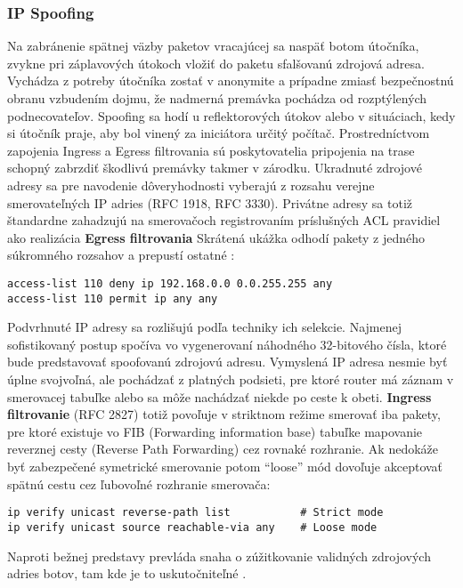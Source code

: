 \documentclass[12pt, a4paper]{article}
\begin{document}
\subsubsection{IP Spoofing}
Na zabránenie spätnej väzby paketov vracajúcej sa naspäť botom útočníka, zvykne pri záplavových útokoch 
vložiť do paketu sfalšovanú zdrojová adresa. Vychádza z potreby útočníka zostať v anonymite a prípadne 
zmiasť bezpečnostnú obranu vzbudením dojmu, že nadmerná premávka pochádza od rozptýlených podnecovateľov. 
Spoofing sa hodí u reflektorových útokov alebo v situáciach, kedy si útočník praje, aby bol vinený za 
iniciátora určitý počítač. Prostredníctvom zapojenia Ingress a Egress filtrovania sú poskytovatelia 
pripojenia na trase schopný zabrzdiť škodlivú premávky takmer v zárodku. Ukradnuté zdrojové adresy sa 
pre navodenie dôveryhodnosti vyberajú z rozsahu verejne smerovateľných IP adries (RFC 1918, RFC 3330). 
Privátne adresy sa totiž  štandardne zahadzujú na smerovačoch registrovaním príslušných ACL pravidiel ako 
realizácia \textbf{Egress filtrovania} Skrátená ukážka odhodí pakety z jedného súkromného rozsahov a 
prepustí ostatné \cite{cisco-spoofing-rules}: 
\begin{lstlisting}
access-list 110 deny ip 192.168.0.0 0.0.255.255 any
access-list 110 permit ip any any
\end{lstlisting}

Podvrhnuté IP adresy sa rozlišujú podľa techniky ich selekcie. Najmenej sofistikovaný postup spočíva vo 
vygenerovaní náhodného 32-bitového čísla, ktoré bude predstavovať spoofovanú zdrojovú adresu. 
Vymyslená IP adresa nesmie byť úplne svojvoľná, ale pochádzať z platných podsieti, pre ktoré router má 
záznam v smerovacej tabuľke alebo sa môže nachádzať niekde po ceste k obeti. \textbf{Ingress filtrovanie}
(RFC 2827) totiž povoľuje v striktnom režime smerovať iba pakety, pre ktoré existuje vo FIB (Forwarding 
information base) tabuľke mapovanie reverznej cesty (Reverse Path Forwarding) cez rovnaké rozhranie. Ak 
nedokáže byť zabezpečené symetrické  smerovanie potom \enquote{loose} mód dovoľuje akceptovať spätnú cestu 
cez ľubovoľné rozhranie smerovača:
\begin{lstlisting}
ip verify unicast reverse-path list           # Strict mode
ip verify unicast source reachable-via any    # Loose mode
\end{lstlisting}
Naproti bežnej predstavy prevláda snaha o zúžitkovanie validných zdrojových adries botov, tam kde 
je to uskutočniteľné \cite{ddos-anatomy-2004}.
\end{document}
